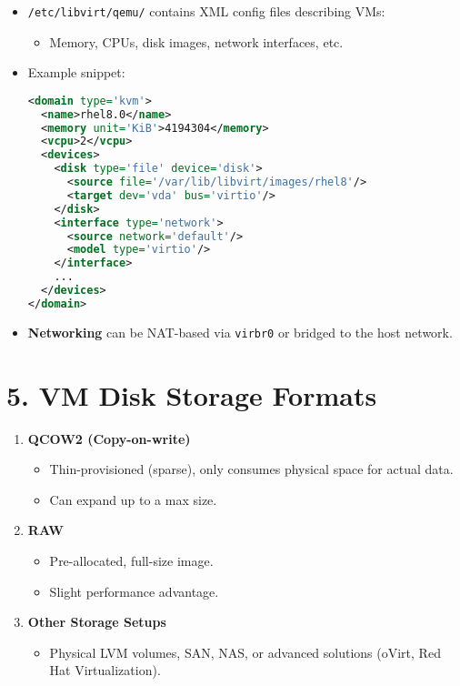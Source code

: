 \documentclass[12pt,a4paper]{report}
\begin{document}
\begin{itemize}
    \item \texttt{/etc/libvirt/qemu/} contains XML config files describing VMs:
    \begin{itemize}
        \item Memory, CPUs, disk images, network interfaces, etc.
    \end{itemize}
    \item Example snippet:
    \begin{lstlisting}[language=xml]
<domain type='kvm'>
  <name>rhel8.0</name>
  <memory unit='KiB'>4194304</memory>
  <vcpu>2</vcpu>
  <devices>
    <disk type='file' device='disk'>
      <source file='/var/lib/libvirt/images/rhel8'/>
      <target dev='vda' bus='virtio'/>
    </disk>
    <interface type='network'>
      <source network='default'/>
      <model type='virtio'/>
    </interface>
    ...
  </devices>
</domain>
    \end{lstlisting}
    \item \textbf{Networking} can be NAT-based via \texttt{virbr0} or bridged to the host network.
\end{itemize}

\section*{5. VM Disk Storage Formats}

\begin{enumerate}
    \item \textbf{QCOW2 (Copy-on-write)}
    \begin{itemize}
        \item Thin-provisioned (sparse), only consumes physical space for actual data.
        \item Can expand up to a max size.
    \end{itemize}

    \item \textbf{RAW}
    \begin{itemize}
        \item Pre-allocated, full-size image.
        \item Slight performance advantage.
    \end{itemize}

    \item \textbf{Other Storage Setups}
    \begin{itemize}
        \item Physical LVM volumes, SAN, NAS, or advanced solutions (oVirt, Red Hat Virtualization).
    \end{itemize}
\end{enumerate}
\end{document}

